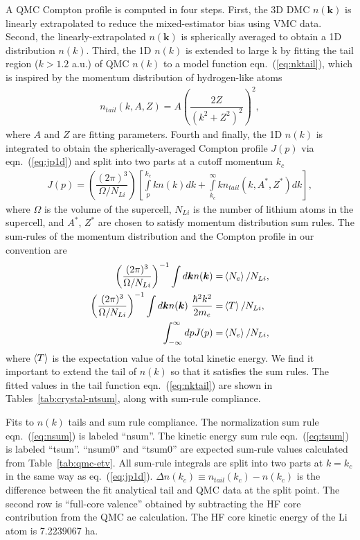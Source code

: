 \documentclass[aps,prl,superscriptaddress]{revtex4-1}
\newcommand{\bs}{\boldsymbol}
\begin{document}
A QMC Compton profile is computed in four steps. First, the 3D DMC $n(\bs{k})$ is linearly extrapolated to reduce the mixed-estimator bias using VMC data. Second, the linearly-extrapolated $n(\bs{k})$ is spherically averaged to obtain a 1D distribution $n(k)$. Third, the 1D $n(k)$ is extended to large k by fitting the tail region ($k > 1.2$ a.u.) of QMC $n(k)$ to a model function eqn.~(\ref{eq:nktail}), which is inspired by the momentum distribution of hydrogen-like atoms
\begin{align} \label{eq:nktail}
n_{tail}(k, A, Z) = A\left(\dfrac{2Z}{(k^2+Z^2)^2}\right)^2,
\end{align}
where $A$ and $Z$ are fitting parameters. Fourth and finally, the 1D $n(k)$ is integrated to obtain the spherically-averaged Compton profile $J(p)$ via eqn.~(\ref{eq:jp1d}) and split into two parts at a cutoff momentum $k_c$
\begin{align} \label{eq:jp1d}
J(p) = \left( \dfrac{(2\pi)^3}{\Omega/N_{Li}} \right)\left[
\int\limits_p^{k_c} k n(k) dk + \int\limits_{k_c}^{\infty} k n_{tail}(k, A^*, Z^*) dk
\right],
\end{align}
where $\Omega$ is the volume of the supercell, $N_{Li}$ is the number of lithium atoms in the supercell, and $A^*$, $Z^*$ are chosen to satisfy momentum distribution sum rules. %
The sum-rules of the momentum distribution and the Compton profile in our convention are
\begin{align}
\left( \dfrac{(2\pi)^3}{\Omega/N_{Li}} \right)^{-1} \int d\bs{k} n(\bs{k}) =& \braket{N_e}/N_{Li}, \label{eq:nsum} \\
\left( \dfrac{(2\pi)^3}{\Omega/N_{Li}} \right)^{-1} \int d\bs{k} n(\bs{k})~\frac{\hbar^2k^2}{2m_e} =& \braket{T}/N_{Li}, \label{eq:tsum} \\
\int_{-\infty}^{\infty} dp J(p) =& \braket{N_e}/N_{Li}, \label{eq:jpsum}
\end{align}
where $\braket{T}$ is the expectation value of the total kinetic energy. We find it important to extend the tail of $n(k)$ so that it satisfies the sum rules. The fitted values in the tail function eqn.~(\ref{eq:nktail}) are shown in Tables~\ref{tab:crystal-ntsum}, along with sum-rule compliance.

\begin{table}[h]
\caption{Fits to $n(k)$ tails and sum rule compliance. The normalization sum rule eqn.~(\ref{eq:nsum}) is labeled ``nsum''. The kinetic energy sum rule eqn.~(\ref{eq:tsum}) is labeled ``tsum''. ``nsum0'' and ``tsum0'' are expected sum-rule values calculated from Table~\ref{tab:qmc-etv}. All sum-rule integrals are split into two parts at $k=k_c$ in the same way as eq.~(\ref{eq:jp1d}). $\Delta n(k_c)\equiv n_{tail}(k_c)-n(k_c)$ is the difference between the fit analytical tail and QMC data at the split point. The second row is ``full-core valence'' obtained by subtracting the HF core contribution from the QMC ae calculation. The HF core kinetic energy of the Li atom is 7.2239067 ha.}

\label{tab:crystal-ntsum}
\end{table}
\end{document}
